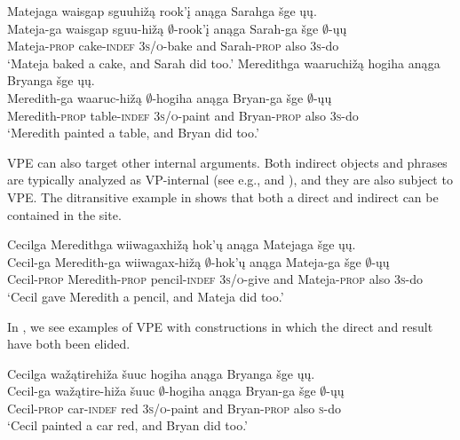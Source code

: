 \documentclass[output=paper]{LSP/langsci}
\begin{document}
\ea\label{ex:johnson:4}
\ea\label{ex:johnson:4a} 
\glll Matejaga {\ob}{\sVP} {waisgap sguuhižą} rook'į{\cb} anąga Sarahga šge {\ob}ųų{\cb}.\\
Mateja-ga {} {waisgap sguu-hižą} $\emptyset$-rook'į anąga Sarah-ga šge $\emptyset$-ųų\\
Mateja-\textsc{prop} {} cake-\textsc{indef} \textsc{3s/o}-bake and Sarah-\textsc{prop} also \textsc{3s}-do\\
\trans `Mateja baked a cake, and Sarah did too.' 
\ex\label{ex:johnson:4b} 
\glll Meredithga {\ob}{\sVP} waaruchižą hogiha{\cb} anąga Bryanga šge {\ob}ųų{\cb}.\\
Meredith-ga {} waaruc-hižą $\emptyset$-hogiha anąga Bryan-ga šge $\emptyset$-ųų\\
Meredith-\textsc{prop} {} table-\textsc{indef} \textsc{3s/o}-paint and Bryan-\textsc{prop} also \textsc{3s}-do\\
\trans `Meredith painted a table, and Bryan did too.'
\z
\z

VPE can also target other internal arguments. Both indirect objects and  phrases are typically analyzed as VP-internal (see e.g., \citealt{Larson1988} and \citealt{LevinRappaportHovav1995}), and they are also subject to VPE. The ditransitive example in  shows that both a direct  and indirect  can be contained in the  site.

 
\ea\label{ex:johnson:5} 
\glll Cecilga {\ob}{\sVP} Meredithga wiiwagaxhižą hok'ų{\cb} anąga Matejaga šge {\ob}ųų{\cb}.\\
Cecil-ga {} Meredith-ga wiiwagax-hižą $\emptyset$-hok'ų anąga Mateja-ga šge $\emptyset$-ųų\\
Cecil-\textsc{prop} {} Meredith-\textsc{prop} pencil-\textsc{indef} \textsc{3s/o}-give and Mateja-\textsc{prop} also \textsc{3s}-do\\
\trans `Cecil gave Meredith a pencil, and Mateja did too.'
\z

In , we see examples of VPE with  constructions in which the direct  and result have both been elided. 
 
\ea\label{ex:johnson:6}
\ea\label{ex:johnson:6a} 
\glll Cecilga  {\ob}{\sVP} wažątirehiža šuuc hogiha{\cb} anąga Bryanga šge {\ob}ųų{\cb}.\\
Cecil-ga {} wažątire-hiža šuuc $\emptyset$-hogiha anąga Bryan-ga šge $\emptyset$-ųų\\
Cecil-\textsc{prop} {} car-\textsc{indef} red \textsc{3s/o}-paint and Bryan-\textsc{prop} also \textsc {s}-do\\
\trans `Cecil painted a car red, and Bryan did too.'
 
\end{document}
